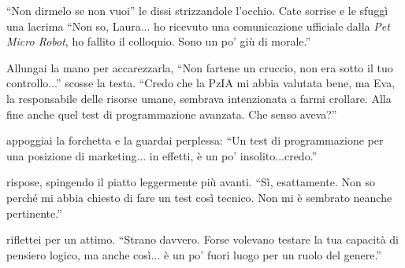 \begin{dialogue}
 \enquote{Non dirmelo se non vuoi} le dissi strizzandole l'occhio. Cate sorrise e le sfuggì una lacrima
 \enquote{Non so, Laura... ho  ricevuto una comunicazione ufficiale dalla \emph{Pet Micro Robot}, ho fallito il colloquio. Sono un po' giù di morale.}

 Allungai la mano per accarezzarla, \enquote{Non fartene un cruccio, non era sotto il tuo controllo...} 
 scosse la testa. \enquote{Credo che la PzIA mi abbia valutata bene, ma Eva, la responsabile delle risorse umane, sembrava intenzionata a farmi crollare. Alla fine anche quel test di programmazione avanzata. Che senso aveva?}

 appoggiai la forchetta e la guardai perplessa: \enquote{Un test di programmazione per una posizione di marketing... in effetti, è un po' insolito...credo.}

 rispose, spingendo il piatto leggermente più avanti. \enquote{Sì, esattamente. Non so perché mi abbia chiesto di fare un test così tecnico. Non mi è sembrato neanche pertinente.}

 riflettei per un attimo. \enquote{Strano davvero. Forse volevano testare la tua capacità di pensiero logico, ma anche così... è un po' fuori luogo per un ruolo del genere.}

\end{dialogue}
\begin{center}
\begin{minipage}{0.7\textwidth}
    \centering
    
\end{minipage}
\end{center}
